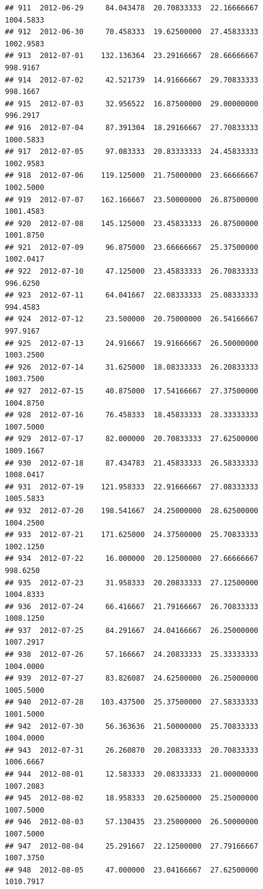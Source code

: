 \documentclass[
]{article}
\begin{document}
\begin{verbatim}
## 911  2012-06-29     84.043478  20.70833333  22.16666667    1004.5833
## 912  2012-06-30     70.458333  19.62500000  27.45833333    1002.9583
## 913  2012-07-01    132.136364  23.29166667  28.66666667     998.9167
## 914  2012-07-02     42.521739  14.91666667  29.70833333     998.1667
## 915  2012-07-03     32.956522  16.87500000  29.00000000     996.2917
## 916  2012-07-04     87.391304  18.29166667  27.70833333    1000.5833
## 917  2012-07-05     97.083333  20.83333333  24.45833333    1002.9583
## 918  2012-07-06    119.125000  21.75000000  23.66666667    1002.5000
## 919  2012-07-07    162.166667  23.50000000  26.87500000    1001.4583
## 920  2012-07-08    145.125000  23.45833333  26.87500000    1001.8750
## 921  2012-07-09     96.875000  23.66666667  25.37500000    1002.0417
## 922  2012-07-10     47.125000  23.45833333  26.70833333     996.6250
## 923  2012-07-11     64.041667  22.08333333  25.08333333     994.4583
## 924  2012-07-12     23.500000  20.75000000  26.54166667     997.9167
## 925  2012-07-13     24.916667  19.91666667  26.50000000    1003.2500
## 926  2012-07-14     31.625000  18.08333333  26.20833333    1003.7500
## 927  2012-07-15     40.875000  17.54166667  27.37500000    1004.8750
## 928  2012-07-16     76.458333  18.45833333  28.33333333    1007.5000
## 929  2012-07-17     82.000000  20.70833333  27.62500000    1009.1667
## 930  2012-07-18     87.434783  21.45833333  26.58333333    1008.0417
## 931  2012-07-19    121.958333  22.91666667  27.08333333    1005.5833
## 932  2012-07-20    198.541667  24.25000000  28.62500000    1004.2500
## 933  2012-07-21    171.625000  24.37500000  25.70833333    1002.1250
## 934  2012-07-22     16.000000  20.12500000  27.66666667     998.6250
## 935  2012-07-23     31.958333  20.20833333  27.12500000    1004.8333
## 936  2012-07-24     66.416667  21.79166667  26.70833333    1008.1250
## 937  2012-07-25     84.291667  24.04166667  26.25000000    1007.2917
## 938  2012-07-26     57.166667  24.20833333  25.33333333    1004.0000
## 939  2012-07-27     83.826087  24.62500000  26.25000000    1005.5000
## 940  2012-07-28    103.437500  25.37500000  27.58333333    1001.5000
## 942  2012-07-30     56.363636  21.50000000  25.70833333    1004.0000
## 943  2012-07-31     26.260870  20.20833333  20.70833333    1006.6667
## 944  2012-08-01     12.583333  20.08333333  21.00000000    1007.2083
## 945  2012-08-02     18.958333  20.62500000  25.25000000    1007.5000
## 946  2012-08-03     57.130435  23.25000000  26.50000000    1007.5000
## 947  2012-08-04     25.291667  22.12500000  27.79166667    1007.3750
## 948  2012-08-05     47.000000  23.04166667  27.62500000    1010.7917

\end{verbatim}
\end{document}
